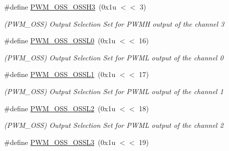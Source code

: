 \begin{DoxyCompactItemize}
\mbox{\label{group__SAME70__PWM_gac3dd2a5be39e742b7fb03897a7469460}} 
\#define \mbox{\hyperlink{group__SAME70__PWM_gac3dd2a5be39e742b7fb03897a7469460}{P\+W\+M\+\_\+\+O\+S\+S\+\_\+\+O\+S\+S\+H3}}~(0x1u $<$$<$ 3)
\begin{DoxyCompactList}\small\item\em (P\+W\+M\+\_\+\+O\+SS) Output Selection Set for P\+W\+MH output of the channel 3 \end{DoxyCompactList}\item 
\mbox{\label{group__SAME70__PWM_gaaf27227163d1b122a0851ec9e8ca8675}} 
\#define \mbox{\hyperlink{group__SAME70__PWM_gaaf27227163d1b122a0851ec9e8ca8675}{P\+W\+M\+\_\+\+O\+S\+S\+\_\+\+O\+S\+S\+L0}}~(0x1u $<$$<$ 16)
\begin{DoxyCompactList}\small\item\em (P\+W\+M\+\_\+\+O\+SS) Output Selection Set for P\+W\+ML output of the channel 0 \end{DoxyCompactList}\item 
\mbox{\label{group__SAME70__PWM_ga7d2aa22a2ea9308f31791f9df7d568df}} 
\#define \mbox{\hyperlink{group__SAME70__PWM_ga7d2aa22a2ea9308f31791f9df7d568df}{P\+W\+M\+\_\+\+O\+S\+S\+\_\+\+O\+S\+S\+L1}}~(0x1u $<$$<$ 17)
\begin{DoxyCompactList}\small\item\em (P\+W\+M\+\_\+\+O\+SS) Output Selection Set for P\+W\+ML output of the channel 1 \end{DoxyCompactList}\item 
\mbox{\label{group__SAME70__PWM_ga17b4e9807df91f7e90f0137b1af1b411}} 
\#define \mbox{\hyperlink{group__SAME70__PWM_ga17b4e9807df91f7e90f0137b1af1b411}{P\+W\+M\+\_\+\+O\+S\+S\+\_\+\+O\+S\+S\+L2}}~(0x1u $<$$<$ 18)
\begin{DoxyCompactList}\small\item\em (P\+W\+M\+\_\+\+O\+SS) Output Selection Set for P\+W\+ML output of the channel 2 \end{DoxyCompactList}\item 
\mbox{\label{group__SAME70__PWM_ga449887747a9e6596f5ae12b16018d485}} 
\#define \mbox{\hyperlink{group__SAME70__PWM_ga449887747a9e6596f5ae12b16018d485}{P\+W\+M\+\_\+\+O\+S\+S\+\_\+\+O\+S\+S\+L3}}~(0x1u $<$$<$ 19)
$$
\end{DoxyCompactItemize}
